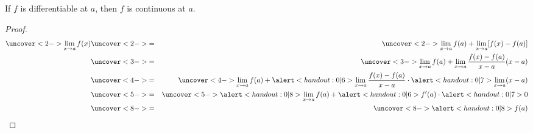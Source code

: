 \begin{frame}
\begin{theorem}
If \alert<handout:0| 6>{$f$ is differentiable at $a$}, then $f$ is continuous at $a$.
\end{theorem}
\begin{proof}
\begin{eqnarray*}
\uncover<2->{\lim_{x\rightarrow a}f(x)}%
 &\uncover<2->{ = } & %
\uncover<2->{\lim_{x\rightarrow a}f(a) + \lim_{x\rightarrow a}[f(x) - f(a)]}\\%
 &\uncover<3->{ = } & %
\uncover<3->{\lim_{x\rightarrow a}f(a) + \lim_{x\rightarrow a}\frac{f(x) - f(a)}{x-a} (x-a)}\\%
 &\uncover<4->{ = } & %
\uncover<4->{\lim_{x\rightarrow a}f(a) + \alert<handout:0| 6>{\lim_{x\rightarrow a}\frac{f(x) - f(a)}{x-a}}\cdot \alert<handout:0| 7>{\lim_{x\rightarrow a}(x-a)}}\\%
 &\uncover<5->{ = } & %
\uncover<5->{\alert<handout:0| 8>{\lim_{x\rightarrow a}f(a)} + \alert<handout:0| 6>{f'(a)} \cdot \alert<handout:0| 7>{0}}\\%
 &\uncover<8->{ = } & %
\uncover<8->{\alert<handout:0| 8>{f(a)}}%
\end{eqnarray*}
%
\end{proof}
\end{frame}
